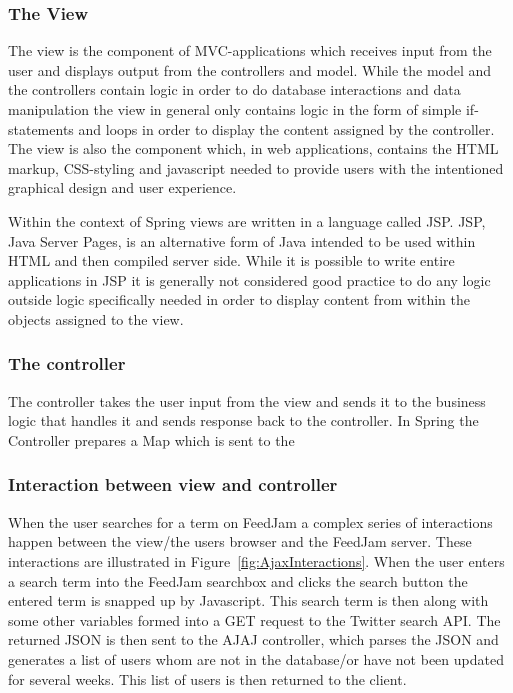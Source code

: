 \subsubsection{The View}
The view is the component of MVC-applications which receives input from the user and displays output from the controllers and model. While the model and the controllers contain logic in order to do database interactions and data manipulation the view in general only contains logic in the form of simple if-statements and loops in order to display the content assigned by the controller. The view is also the component which, in web applications, contains the HTML markup, CSS-styling and javascript needed to provide users with the intentioned graphical design and user experience.

Within the context of Spring views are written in a language called JSP. JSP, Java Server Pages, is an alternative form of Java intended to be used within HTML and then compiled server side. While it is possible to write entire applications in JSP it is generally not considered good practice to do any logic outside logic specifically needed in order to display content from within the objects assigned to the view.

\subsubsection{The controller}
The controller takes the user input from the view and sends it to the business logic that handles it and sends response back to the controller.
In Spring the Controller prepares a Map which is sent to the 

\subsubsection{Interaction between view and controller} %
\label{viewControllerInteraction}
When the user searches for a term on FeedJam a complex series of interactions happen between the view/the users browser and the FeedJam server. These interactions are illustrated in Figure~\ref{fig:AjaxInteractions}. When the user enters a search term into the FeedJam searchbox and clicks the search button the entered term is snapped up by Javascript. This search term is then along with some other variables formed into a GET request to the Twitter search API. The returned JSON is then sent to the AJAJ controller, which parses the JSON and generates a list of users whom are not in the database/or have not been updated for several weeks. This list of users is then returned to the client.

